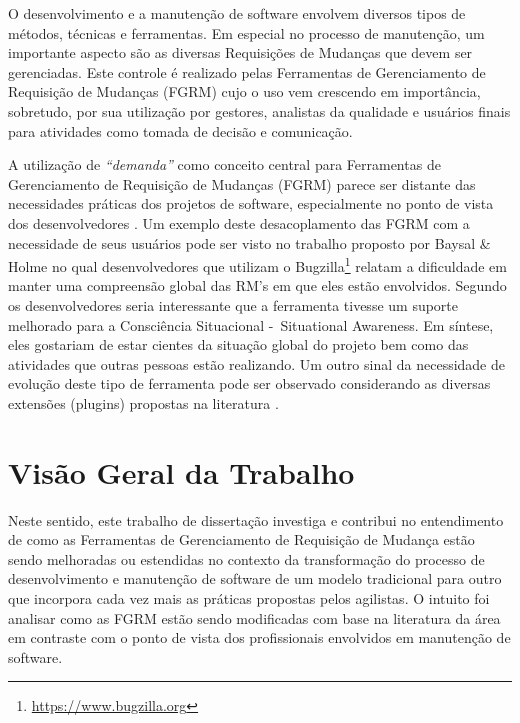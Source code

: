 O desenvolvimento e a manutenção de software envolvem diversos tipos de métodos, técnicas e
ferramentas. Em especial no processo de manutenção, um importante aspecto são as diversas
Requisições de Mudanças que devem ser gerenciadas. Este controle é realizado pelas Ferramentas de
Gerenciamento de Requisição de Mudanças (FGRM) cujo o uso vem crescendo em importância, sobretudo,
por sua utilização por gestores, analistas da qualidade e usuários finais para atividades como
tomada de decisão e comunicação.

A utilização de  \textit{``demanda''} como conceito central para Ferramentas de Gerenciamento de
Requisição de Mudanças (FGRM) parece ser distante das necessidades práticas dos projetos de
software, especialmente no ponto de vista dos desenvolvedores
\cite{Baysal:2013:SAP:2486788.2486957}. Um exemplo deste desacoplamento das FGRM com a necessidade
de seus usuários pode ser visto no trabalho proposto por Baysal \& Holme
\cite{baysal2012qualitative} no qual desenvolvedores que utilizam o
Bugzilla\footnote{\url{https://www.bugzilla.org}} relatam a dificuldade em manter uma compreensão
global das RM's em que eles estão envolvidos. Segundo os desenvolvedores seria interessante que a
ferramenta tivesse um suporte melhorado para a Consciência Situacional -~Situational Awareness. Em
síntese, eles gostariam de estar cientes da situação global do projeto bem como das atividades que
outras pessoas estão realizando. Um outro sinal da necessidade de evolução deste tipo de ferramenta
pode ser observado considerando as diversas extensões (plugins) propostas na literatura
\cite{101186,Thung:2014:BIT:2635868.2661678,Kononenko:2014:DED:2591062.2591075}.

\section{Visão Geral da Trabalho}
\label{sec:intro-visao-geral}

Neste sentido, este trabalho de dissertação investiga e contribui no entendimento de
como as Ferramentas de Gerenciamento de Requisição de Mudança estão sendo melhoradas ou estendidas
no contexto da transformação do processo de desenvolvimento e manutenção de software de um modelo
tradicional para outro que incorpora cada vez mais as práticas propostas pelos agilistas. O intuito
foi analisar como as FGRM estão sendo modificadas com base na literatura da área em contraste com o
ponto de vista dos profissionais envolvidos em manutenção de software.

